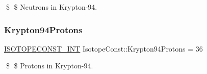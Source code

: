 \$ \$ Neutrons in Krypton-\/94. \mbox{\label{group___isotope_const-_krypton-_kr94_gaf2f9950b659fda8959bd5f65b52375c1}} 
\subsubsection{\texorpdfstring{Krypton94\+Protons}{Krypton94Protons}}
{\footnotesize\ttfamily \mbox{\hyperlink{group___isotope_const-_macros_ga5f18360b3e99483a35c32d789e62621c}{I\+S\+O\+T\+O\+P\+E\+C\+O\+N\+S\+T\+\_\+\+I\+NT}} Isotope\+Const\+::\+Krypton94\+Protons = 36}

\$ \$ Protons in Krypton-\/94. 